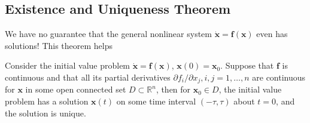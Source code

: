 \subsection{Existence and Uniqueness Theorem}
We have no guarantee that the general nonlinear system $\mathbf{\dot{x}=f(x)}$ even has solutions! This theorem helps
\begin{theorem}{\label{thm:eut}}
	Consider the initial value problem $\mathbf{\dot{x}=f(x)}$, $\mathbf{x}(0)=\mathbf{x}_0$. Suppose that $\mathbf{f}$ is continuous and that all its partial derivatives $\partial f_i/\partial x_j, i,j=1,\ldots,n$ are continuous for $\mathbf{x}$ in some open connected set $D\subset\mathbb{R}^n$,
	then for $\mathbf{x}_0\in D$, the initial value problem has a solution $\mathbf{x}(t)$ on some time interval $(-\tau,\tau)$ about $t=0$, and the solution is unique.
\end{theorem}
